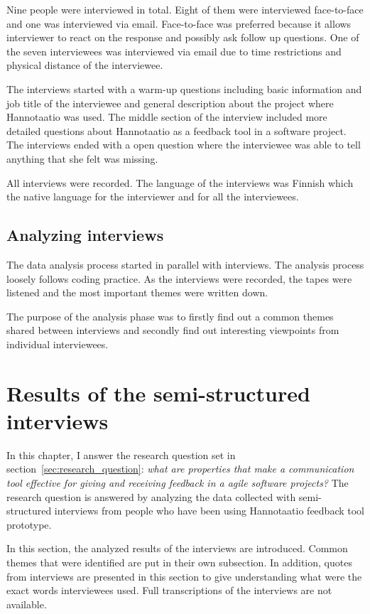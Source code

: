 \documentclass[english,12pt,a4paper,pdftex]{article}
\begin{document}
Nine people were interviewed in total. Eight of them were interviewed face-to-face and one was interviewed via email. Face-to-face was preferred because it allows interviewer to react on the response and possibly ask follow up questions. One of the seven interviewees was interviewed via email due to time restrictions and physical distance of the interviewee.

The interviews started with a warm-up questions including basic information and job title of the interviewee and general description about the project where Hannotaatio was used. The middle section of the interview included more detailed questions about Hannotaatio as a feedback tool in a software project. The interviews ended with a open question where the interviewee was able to tell anything that she felt was missing.

All interviews were recorded. The language of the interviews was Finnish which the native language for the interviewer and for all the interviewees.

\subsection{Analyzing interviews}

The data analysis process started in parallel with interviews. The analysis process loosely follows coding practice. As the interviews were recorded, the tapes were listened and the most important themes were written down. 

The purpose of the analysis phase was to firstly find out a common themes shared between interviews and secondly find out interesting viewpoints from individual interviewees.

\clearpage

\section{Results of the semi-structured interviews}
\label{sec:results}
\acresetall

In this chapter, I answer the research question set in section~\ref{sec:research_question}: \textit{what are properties that make a communication tool effective for giving and receiving feedback in a agile software projects?} The research question is answered by analyzing the data collected with semi-structured interviews from people who have been using Hannotaatio feedback tool prototype.

In this section, the analyzed results of the interviews are introduced. Common themes that were identified are put in their own subsection. In addition, quotes from interviews are presented in this section to give understanding what were the exact words interviewees used. Full transcriptions of the interviews are not available.
\end{document}
